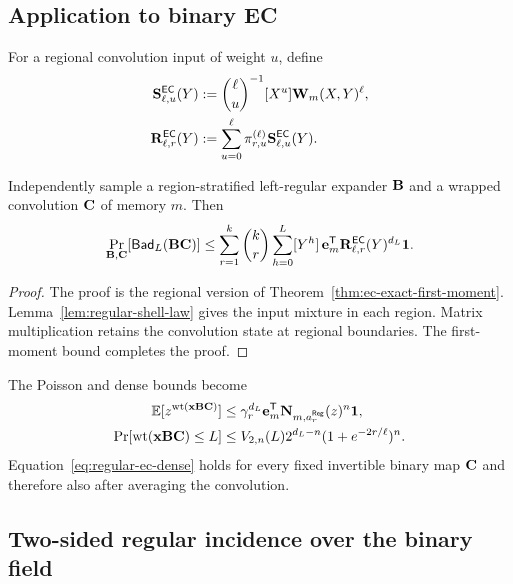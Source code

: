 \subsection{Application to binary EC}

For a regional convolution input of weight $u$, define
\begin{align}
 \mathbf S^{\mathsf{EC}}_{\ell,u}(Y)
 &:=\binom{\ell}{u}^{-1}[X^u]\mathbf W_m(X,Y)^\ell,
 \label{eq:regular-ec-slice}\\
 \mathbf R^{\mathsf{EC}}_{\ell,r}(Y)
 &:=\sum_{u=0}^{\ell}\pi^{(\ell)}_{r,u}
 \mathbf S^{\mathsf{EC}}_{\ell,u}(Y).
 \label{eq:regular-ec-region}
\end{align}

\begin{theorem}
\label{thm:regular-ec-first-moment}
Independently sample a region-stratified left-regular expander $\mathbf B$ and a
wrapped convolution $\mathbf C$ of memory $m$.  Then
\begin{equation}
 \Pr_{\mathbf B,\mathbf C}[\mathsf{Bad}_L(\mathbf B\mathbf C)]\leq
 \sum_{r=1}^{k}\binom{k}{r}\sum_{h=0}^{L}[Y^h]\,
 \mathbf e_m^{\mathsf T}
 \mathbf R^{\mathsf{EC}}_{\ell,r}(Y)^{d_L}\mathbf 1.
 \label{eq:regular-ec-first-moment}
\end{equation}
\end{theorem}

\begin{proof}
The proof is the regional version of
Theorem~\ref{thm:ec-exact-first-moment}.  Lemma~\ref{lem:regular-shell-law}
gives the input mixture in each region.  Matrix multiplication retains the
convolution state at regional boundaries.  The first-moment bound completes
the proof.
\end{proof}

The Poisson and dense bounds become
\begin{align}
 \mathbb E[z^{\operatorname{wt}(\mathbf x\mathbf B\mathbf C)}]
 &\leq\gamma_r^{d_L}
 \mathbf e_m^{\mathsf T}\mathbf N_{m,a^{\mathsf{Reg}}_r}(z)^n\mathbf 1,
 \label{eq:regular-ec-poisson}\\
 \Pr[\operatorname{wt}(\mathbf x\mathbf B\mathbf C)\leq L]
 &\leq V_{2,n}(L)2^{d_L-n}(1+e^{-2r/\ell})^n.
 \label{eq:regular-ec-dense}
\end{align}
Equation~\eqref{eq:regular-ec-dense} holds for every fixed invertible binary
map $\mathbf C$ and therefore also after averaging the convolution.

\subsection{Two-sided regular incidence over the binary field}
\label{sec:binary-two-sided-regular}

